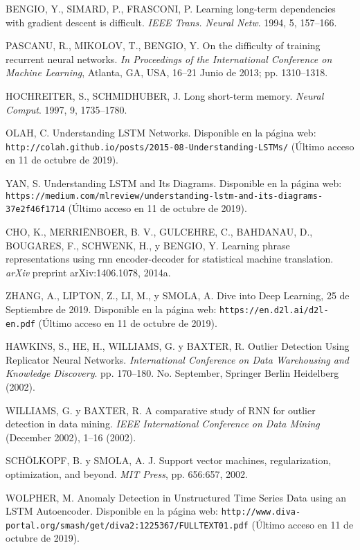 \begin{thebibliography}{9}
 BENGIO, Y., SIMARD, P., FRASCONI, P. Learning long-term dependencies with gradient descent is difficult. \textit{IEEE Trans. Neural Netw}. 1994, 5, 157–166.

 PASCANU, R., MIKOLOV, T., BENGIO, Y. On the difficulty of training recurrent neural networks. \textit{In Proceedings of the International Conference on Machine Learning}, Atlanta, GA, USA, 16–21 Junio de 2013; pp. 1310–1318.

 HOCHREITER, S., SCHMIDHUBER, J. Long short-term memory. \textit{Neural Comput}. 1997, 9, 1735–1780.

 OLAH, C. Understanding LSTM Networks. Disponible en la p\'{a}gina web: \texttt{http://colah.github.io/posts/2015-08-Understanding-LSTMs/} (\'{U}ltimo acceso en 11 de octubre de 2019).

 YAN, S. Understanding LSTM and Its Diagrams. Disponible en la p\'{a}gina web: \texttt{https://medium.com/mlreview/understanding-lstm-and-its-diagrams-37e2f46f1714} (\'{U}ltimo acceso en 11 de octubre de 2019).

 CHO, K., MERRI\"{E}NBOER, B. V., GULCEHRE, C., BAHDANAU, D., BOUGARES, F., SCHWENK, H., y BENGIO, Y. Learning phrase representations using rnn encoder-decoder for statistical machine translation. \textit{arXiv} preprint arXiv:1406.1078, 2014a.

 ZHANG, A., LIPTON, Z., LI, M., y SMOLA, A. Dive into Deep Learning, 25 de Septiembre de 2019. Disponible en la p\'{a}gina web: \texttt{https://en.d2l.ai/d2l-en.pdf} (\'{U}ltimo acceso en 11 de octubre de 2019).

 HAWKINS, S., HE, H., WILLIAMS, G. y BAXTER, R. Outlier Detection Using Replicator Neural Networks. \textit{International Conference on Data Warehousing and Knowledge Discovery}. pp. 170–180. No. September, Springer Berlin Heidelberg (2002).

  WILLIAMS, G. y BAXTER, R. A comparative study of RNN for outlier detection in data mining. \textit{IEEE International Conference on Data Mining} (December 2002), 1–16 (2002).

 SCH\"{O}LKOPF, B. y SMOLA, A. J. Support vector machines, regularization, optimization, and beyond. \textit{MIT Press}, pp. 656:657, 2002.

 WOLPHER, M. Anomaly Detection in Unstructured Time Series Data using an LSTM Autoencoder. Disponible en la p\'{a}gina web: \texttt{http://www.diva-portal.org/smash/get/diva2:1225367/FULLTEXT01.pdf} (\'{U}ltimo acceso en 11 de octubre de 2019).


\end{thebibliography}
